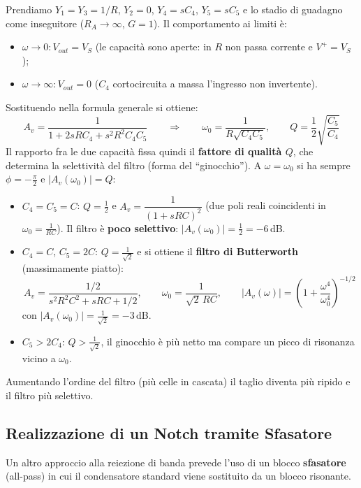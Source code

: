 Prendiamo $Y_1 = Y_3 = 1/R$, $Y_2 = 0$, $Y_4 = sC_4$, $Y_5 = sC_5$ e lo stadio di guadagno come inseguitore ($R_A \to \infty$, $G = 1$). Il comportamento ai limiti è:
\begin{itemize}
    \item $\omega \to 0 : V_{out} = V_S$ \quad (le capacità sono aperte: in $R$ non passa corrente e $V^+ = V_S$);
    \item $\omega \to \infty : V_{out} = 0$ \quad ($C_4$ cortocircuita a massa l'ingresso non invertente).
\end{itemize}
Sostituendo nella formula generale si ottiene:
\[
A_v = \frac{1}{1 + 2sRC_4 + s^2R^2C_4C_5}
\qquad\Longrightarrow\qquad
\omega_0 = \frac{1}{R\sqrt{C_4C_5}}, \qquad Q = \frac{1}{2}\sqrt{\frac{C_5}{C_4}}
\]
Il rapporto fra le due capacità fissa quindi il \textbf{fattore di qualità $Q$}, che determina la selettività del filtro (forma del ``ginocchio''). A $\omega = \omega_0$ si ha sempre $\phi = -\frac{\pi}{2}$ e $|A_v(\omega_0)| = Q$:
\begin{itemize}
    \item $C_4 = C_5 = C$: $Q = \frac{1}{2}$ e $A_v = \dfrac{1}{(1+sRC)^2}$ (due poli reali coincidenti in $\omega_0 = \frac{1}{RC}$). Il filtro è \textbf{poco selettivo}: $|A_v(\omega_0)| = \frac12 = -6$\,dB.
    \item $C_4 = C$, $C_5 = 2C$: $Q = \frac{1}{\sqrt{2}}$ e si ottiene il \textbf{filtro di Butterworth} (massimamente piatto):
    \begin{equation}
    A_v = \frac{1/2}{s^2 R^2 C^2 + sRC + 1/2}, \qquad \omega_0 = \frac{1}{\sqrt{2}\,RC}, \qquad |A_v(\omega)| = \left(1 + \frac{\omega^4}{\omega_0^4}\right)^{-1/2}
    \end{equation}
    con $|A_v(\omega_0)| = \frac{1}{\sqrt 2} = -3$\,dB.
    \item $C_5 > 2C_4$: $Q > \frac{1}{\sqrt{2}}$, il ginocchio è più netto ma compare un picco di risonanza vicino a $\omega_0$.
\end{itemize}
Aumentando l'ordine del filtro (più celle in cascata) il taglio diventa più ripido e il filtro più selettivo.

\subsection{Realizzazione di un Notch tramite Sfasatore}
Un altro approccio alla reiezione di banda prevede l'uso di un blocco \textbf{sfasatore} (all-pass) in cui il condensatore standard viene sostituito da un blocco risonante.


